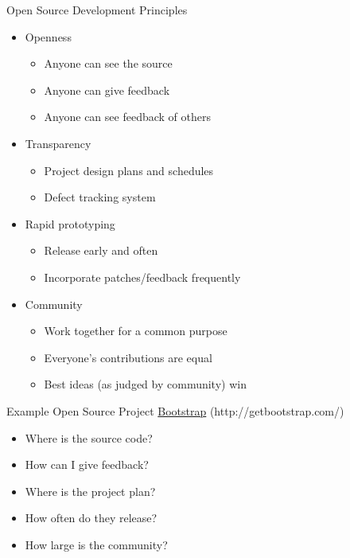 \documentclass{beamer}
\begin{document}
\begin{frame}{Open Source Development Principles}
\begin{itemize}
\item Openness
\begin{itemize}
\item Anyone can see the source
\item Anyone can give feedback
\item Anyone can see feedback of others
\end{itemize}
\item Transparency
\begin{itemize}
\item Project design plans and schedules
\item Defect tracking system
\end{itemize}
\item Rapid prototyping
\begin{itemize}
\item Release early and often
\item Incorporate patches/feedback frequently
\end{itemize}
\item Community
\begin{itemize}
\item Work together for a common purpose
\item Everyone's contributions are equal
\item Best ideas (as judged by community) win
\end{itemize}
\end{itemize}
\end{frame}

\begin{frame}{Example Open Source Project}
\href{http://getbootstrap.com/}{Bootstrap} (http://getbootstrap.com/)
\begin{itemize}
\item Where is the source code?
\item How can I give feedback?
\item Where is the project plan?
\item How often do they release?
\item How large is the community?
\end{itemize}
\end{frame}
\end{document}
